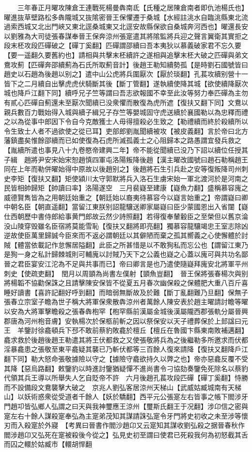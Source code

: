 　　三年春正月曜攻陳倉王連戰死楊曼犇南氐【氏種之居陳倉南者即仇池楊氏也】曜進抜草壁路松多犇隴城又抜隂密晉王保懼遷于桑城【水經註洮水自臨洮縣東北流過索西城又北出門峽又東北逕桑城東又北逕安故縣保欲自桑城奔河西也】曜還長安以劉雅為大司徒張春謀奉晉王保奔涼州張寔遣其將隂監將兵迎之聲言翼衛其實拒之　段末柸攻段匹磾破之【磾丁奚翻】匹磾謂邵續曰吾本夷狄以慕義破家君不忘久要【要一遥翻久要舊約也】請相與共擊末柸續許之遂相與追擊末柸大破之匹磾與弟文鴦攻薊【匹磾奔邵續薊為石氏所取薊音計】後趙王勒知續勢孤【是時劉石國號皆曰趙史以石趙為後趙以别之】遣中山公虎將兵圍厭次【厭於琰翻】孔萇攻續别營十一皆下之二月續自出擊虎虎伏騎斷其後【斷丁管翻】遂執續使降其城【欲使續降厭次城也降戶江翻下同】續呼兄子竺等謂曰吾志欲報國不幸至此汝等努力奉匹磾為主勿有貳心匹磾自薊還未至厭次聞續已没衆懼而散復為虎所遮【復扶又翻下同】文鴦以親兵數百力戰始得入城與續子緝兄子存竺等嬰城固守虎送續於襄國勒以為忠釋而禮之以為從事中郎因下令自今克敵獲士人毋得擅殺必生致之【勒禮續而終於殺續所以令生致士人者不過欲使之從已耳】吏部郎劉胤聞續被攻【被皮義翻】言於帝曰北方藩鎮盡矣惟餘邵續而已如使復為石虎所滅孤義士之心阻歸本之路愚謂宜發兵救之【胤續所遣也事見八十九卷愍帝建興二年】帝不能從聞續已没乃下詔以續位任授其子緝　趙將尹安宋始宋恕趙慎四軍屯洛陽叛降後趙【漢主曜改國號曰趙石勒稱趙王同在上年而勒併曜始得中原故以後趙别之】後趙將石生引兵赴之安等復叛降司州刺史李矩【復扶又翻】矩使潁川太守郭默將兵入洛石生虜宋始一軍北渡河於是河南之民皆相帥歸矩【帥讀曰率】洛陽遂空　三月裴嶷至建康【嶷魚力翻】盛稱慕容廆之威德賢雋皆為之用朝廷始重之【朝廷始以裔夷待慕容今以嶷言始重之】帝謂嶷曰卿中朝名臣【朝直遥翻】當留江東朕别詔龍驤送卿家屬嶷曰臣少蒙國恩出入省闥【嶷仕西朝歷中書侍郎給事黄門郎故云然少詩照翻】若得復奉輦轂臣之至榮但以舊京淪没山陵穿毁雖名臣宿將莫能雪恥【復扶又翻將即亮翻】獨慕容龍驤竭忠王室志除凶逆故使臣萬里歸誠今臣來而不返必謂朝廷以其僻陋而棄之孤其嚮義之心使懈體於討賊【體當依載記作怠懈居隘翻】此臣之所甚惜是以不敢狥私而忘公也【謂留江東乃是狥一身之私計歸棘城則可輔廆以討賊乃天下之公義也嶷之心蓋以廆可與共功名鄙晉之君臣宴安江沱為不足與共事而已】帝曰卿言是也乃遣使隨嶷拜廆安北將軍平州刺史【使疏吏翻】　閏月以周顗為尚書左僕射【顗魚豈翻】　晉王保將張春楊次與别將楊韜不協勸保誅之且請擊陳安保皆不從夏五月春次幽保殺之保體肥大重八百斤喜睡好讀書【喜許記翻好呼到翻】而暗弱無斷故及於難【斷丁亂翻難乃旦翻】保無子張春立宗室子瞻為世子稱大將軍保衆散犇涼州者萬餘人陳安表於趙主曜請討瞻等曜以安為大將軍擊瞻殺之張春犇枹罕【枹罕縣前漢屬金城後漢屬隴西郡張軌分屬晉興郡唐為河州枹音膚】安執楊次於保柩前斬之因以祭保安以天子禮葬保於上邽諡曰元王　羊鑒討徐龕頓兵下邳不敢前蔡豹敗龕於檀丘【檀丘在魯國卞縣東南敗補邁翻】龕求救於後趙後趙王勒遣其將王伏都救之又使張敬將兵為之後繼勒多所邀求而伏都淫暴龕患之張敬至東平龕疑其襲已乃斬伏都等三百餘人復來請降【復扶又翻降戶江翻下同】勒大怒命張敬據險以守之【據險守龕欲持久以弊之也】帝亦惡龕反覆不受其降【惡烏路翻】敕鑒豹以時進討鑒猶疑憚不進尚書令刁協劾奏鑒免死除名以蔡豹代領其兵王導以所舉失人乞自貶帝不許　六月後趙孔萇攻段匹磾【磾丁奚翻】恃勝而不設備段文鴦襲擊大破之　京兆人劉弘客居涼州天梯山【武威姑臧城南有天梯山】以妖術惑衆從受道者千餘人【妖於驕翻】西平元公張寔左右皆事之帳下閻涉牙門趙卭皆弘鄉人弘謂之曰天與我神璽應王涼州【璽斯氏翻王于况翻】涉卬信之密與寔左右十餘人謀殺寔奉弘為主寔弟茂知其謀請誅弘寔令牙門將史初收之未至涉等懷刃而入殺寔於外寢　【考異曰晉書作閻沙趙卬又云寔知其謀收劉弘殺之据晉春秋作閻涉趙卬又弘死在寔被殺後今從之】弘見史初至謂曰使君已死殺我何為初怒截其舌而囚之轘於姑臧市【轘胡悍翻